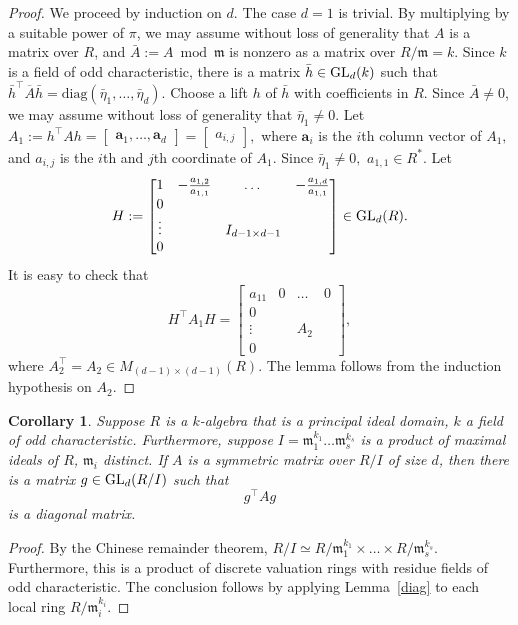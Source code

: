 \documentclass[10pt]{amsart}
\theoremstyle{plain}
\theoremstyle{plain}
\newtheorem{corollary}[theorem]{Corollary}
\renewcommand{\vec}[1]{\mathbf{#1}}
\theoremstyle{remark}
\theoremstyle{definition}
\newcommand{\GL}{\textup{GL}}
\begin{document}
\begin{proof}We proceed by induction on $d$. The case $d=1$ is trivial. By multiplying by a suitable power of $\pi$, we may assume without loss of generality that $A$ is a matrix over $R$, and $\bar{A}:=A\bmod\mathfrak{m}$ is nonzero as a matrix over $R/\mathfrak{m}=k$. Since $k$ is a field of odd characteristic, there is a matrix $\bar{h}\in\GL_d(k)$ such that $\bar{h}^{\intercal}\overline{A}\bar{h}=\text{diag}(\bar{\eta}_1,\hdots,\bar{\eta}_d)$. Choose a lift $h$ of $\bar{h}$ with coefficients in $R$. Since $\bar{A}\neq 0$, we may assume without loss of generality that $\bar{\eta}_1\neq 0.$ Let $A_1:=h^{\intercal}Ah=\begin{bmatrix}\vec{a}_1,\dots,\vec{a}_d  \end{bmatrix}=\begin{bmatrix}a_{i,j}  \end{bmatrix},$ where $\vec{a}_i$ is the $i$th column vector of $A_1,$ and $a_{i,j}$ is the $i$th and $j$th coordinate of $A_1.$ Since $\bar{\eta}_1\neq 0,$  $a_{1,1} \in R^*$.
Let 
\[
H:=\begin{bmatrix}1 &-\frac{a_{1,2}  }{a_{1,1}} & \dots & -\frac{a_{1,d}}{a_{1,1}}
\\
0 &
\\
\vdots &  & I_{{d-1}\times{d-1}}
\\
0
   \end{bmatrix}\in \GL_d(R).
\]
It is easy to check that 
\[
H^{\intercal}A_1H=\begin{bmatrix}a_{11} &0 & \dots & 0
\\
0 &
\\
\vdots &  & A_2
\\
0
   \end{bmatrix},
\]
where $A_2^{\intercal}=A_2\in M_{{(d-1)}\times {(d-1)}}(R).$ The lemma follows from  the induction hypothesis on $A_2.$
\end{proof}
\begin{corollary}\label{cor:diag}Suppose $R$ is a $k$-algebra that is a principal ideal domain, $k$ a field of odd characteristic. Furthermore, suppose $I=\mathfrak{m}_1^{k_1}\dots\mathfrak{m}_s^{k_s}$ is a product of maximal ideals of $R$, $\mathfrak{m}_i$ distinct. If $A$ is a symmetric matrix over $R/I$ of size $d$, then there is a matrix $g\in\GL_d(R/I)$ such that
\[g^{\intercal}Ag\]
is a diagonal matrix.
\end{corollary}
\begin{proof}
By the Chinese remainder theorem, $R/I\simeq R/\mathfrak{m}_1^{k_1}\times\dots\times R/\mathfrak{m}_s^{k_s}$. Furthermore, this is a product of discrete valuation rings with residue fields of odd characteristic. The conclusion follows by applying Lemma~\ref{diag} to each local ring $R/\mathfrak{m}_i^{k_i}$.
\end{proof}
\end{document}

